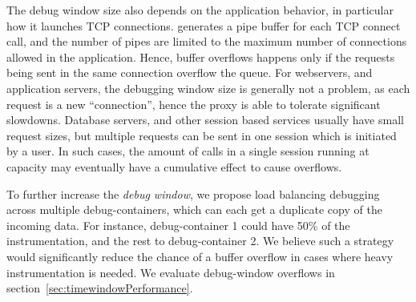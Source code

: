 The debug window size also depends on the application behavior, in particular how it launches TCP connections. 
\parikshan generates a pipe buffer for each TCP connect call, and the number of pipes are limited to the maximum number of connections allowed in the application.
Hence, buffer overflows happens only if the requests being sent in the same connection overflow the queue.
For webservers, and application servers, the debugging window size is generally not a problem, as each request is a new ``connection'', hence the proxy is able to tolerate significant slowdowns.
Database servers, and other session based services usually have small request sizes, but multiple requests can be sent in one session which is initiated by a user. 
In such cases, the amount of calls in a single session running at capacity may eventually have a cumulative effect to cause overflows.

To further increase the \emph{debug window}, we propose load balancing debugging across multiple debug-containers, which can each get a duplicate copy of the incoming data. 
For instance, debug-container 1 could have 50\% of the instrumentation, and the rest to debug-container 2.
We believe such a strategy would significantly reduce the chance of a buffer overflow in cases where heavy instrumentation is needed.
We evaluate debug-window overflows in section~\ref{sec:timewindowPerformance}.

